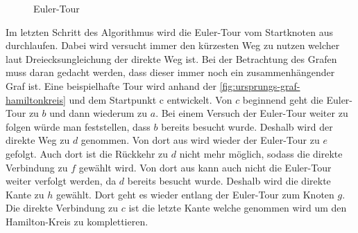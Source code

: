 \documentclass{article}
\begin{document}
\begin{figure}[H]
\centering
{}
\caption{Euler-Tour}
\label{fig:ursprungs-graf-eulertour}
\end{figure}

Im letzten Schritt des Algorithmus wird die Euler-Tour vom Startknoten aus durchlaufen. Dabei wird versucht immer den kürzesten Weg zu nutzen welcher laut Dreiecksungleichung der direkte Weg ist. Bei der Betrachtung des Grafen muss daran gedacht werden, dass dieser immer noch ein zusammenhängender  Graf ist. Eine beispielhafte Tour wird anhand der \autoref{fig:ursprungs-graf-hamiltonkreis} und dem Startpunkt c entwickelt. Von $c$ beginnend geht die Euler-Tour zu $b$ und dann wiederum zu $a$. Bei einem Versuch der Euler-Tour weiter zu folgen würde man feststellen, dass $b$ bereits besucht wurde. Deshalb wird der direkte Weg zu $d$ genommen. Von dort aus wird wieder der Euler-Tour zu $e$ gefolgt. Auch dort ist die Rückkehr zu $d$ nicht mehr möglich, sodass die direkte Verbindung zu $f$ gewählt wird. Von dort aus kann auch nicht die Euler-Tour weiter verfolgt werden, da $d$ bereits besucht wurde. Deshalb wird die direkte Kante zu $h$ gewählt. Dort geht es wieder entlang der Euler-Tour zum Knoten $g$. Die direkte Verbindung zu $c$ ist die letzte Kante welche genommen wird um den Hamilton-Kreis zu komplettieren.
\end{document}
